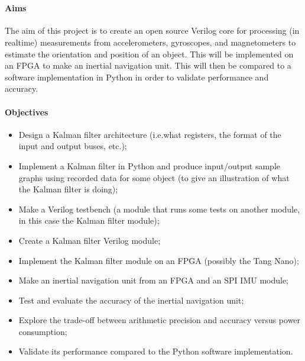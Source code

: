 \documentclass[12pt]{article}
\begin{document}
 \\

\paragraph{Aims}

The aim of this project is to create an open source Verilog core for processing (in realtime) measurements from accelerometers, gyroscopes, and magnetometers to estimate the orientation and position of an object. This will be implemented on an FPGA to make an inertial navigation unit. This will then be compared to a software implementation in Python in order to validate performance and accuracy.

\paragraph{Objectives}

\begin{itemize}[noitemsep]
	\item Design a Kalman filter architecture (i.e.\@ what registers, the format of the input and output buses, etc.);
	\item Implement a Kalman filter in Python and produce input/output sample graphs using recorded data for some object (to give an illustration of what the Kalman filter is doing);
	\item Make a Verilog testbench (a module that runs some tests on another module, in this case the Kalman filter module);
	\item Create a Kalman filter Verilog module;
	\item Implement the Kalman filter module on an FPGA (possibly the Tang Nano);
	\item Make an inertial navigation unit from an FPGA and an SPI IMU module;
	\item Test and evaluate the accuracy of the inertial navigation unit;
	\item Explore the trade-off between arithmetic precision and accuracy versus power consumption;
	\item Validate its performance compared to the Python software implementation.
\end{itemize}
\end{document}

